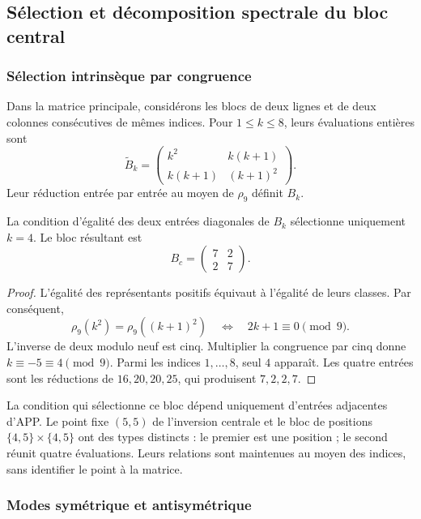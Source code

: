 \subsection{Sélection et décomposition spectrale du bloc central}
\label{geo:bloque-central}

\subsubsection{Sélection intrinsèque par congruence}

Dans la matrice principale, considérons les blocs de deux lignes et de deux colonnes consécutives de mêmes indices. Pour $1\leq k\leq8$, leurs évaluations entières sont
\[
 \widetilde B_k=
 \begin{pmatrix}k^2&k(k+1)\\k(k+1)&(k+1)^2\end{pmatrix}.
\]
Leur réduction entrée par entrée au moyen de $\rho_9$ définit $B_k$.

\begin{teorema}
\label{geo:thm-bloque}
La condition d'égalité des deux entrées diagonales de $B_k$ sélectionne uniquement $k=4$. Le bloc résultant est
\[
 B_c=\begin{pmatrix}7&2\\2&7\end{pmatrix}.
\]
\end{teorema}

\begin{proof}
L'égalité des représentants positifs équivaut à l'égalité de leurs classes. Par conséquent,
\[
 \rho_9(k^2)=\rho_9((k+1)^2)
 \quad\Longleftrightarrow\quad 2k+1\equiv0\pmod9.
\]
L'inverse de deux modulo neuf est cinq. Multiplier la congruence par cinq donne $k\equiv-5\equiv4\pmod9$. Parmi les indices $1,\ldots,8$, seul $4$ apparaît. Les quatre entrées sont les réductions de $16,20,20,25$, qui produisent $7,2,2,7$.
\end{proof}

La condition qui sélectionne ce bloc dépend uniquement d'entrées adjacentes d'APP. Le point fixe $(5,5)$ de l'inversion centrale et le bloc de positions $\{4,5\}\times\{4,5\}$ ont des types distincts : le premier est une position ; le second réunit quatre évaluations. Leurs relations sont maintenues au moyen des indices, sans identifier le point à la matrice.

\subsubsection{Modes symétrique et antisymétrique}

